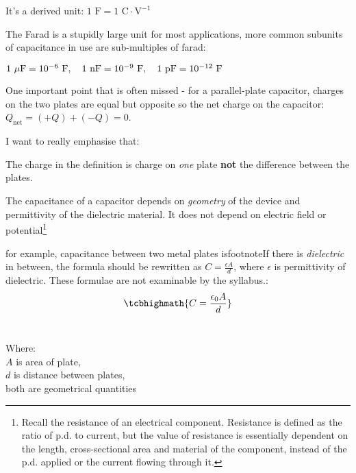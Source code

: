 It's a derived unit: $1 \text{ F} = 1 \text{ C}\cdot\text{V}^{-1}$

The Farad is a stupidly large unit for most applications, more common subunits of capacitance in use are sub-multiples of farad:

{
	
\centering

$1 \text{ $\mu$F} = 10^{-6} \text{ F}, \quad 1 \text{ nF} = 10^{-9} \text{ F}, \quad 1 \text{ pF} = 10^{-12} \text{ F}$

}

One important point that is often missed - for a parallel-plate capacitor, charges on the two plates are equal but opposite so the net charge on the capacitor: $Q_\text{net} = (+Q)+(-Q)=0$. 

I want to really emphasise that:
\begin{ilight}
    The charge in the definition is charge on \emph{one} plate \textbf{not} the difference between the plates.
\end{ilight}

The capacitance of a capacitor depends on \emph{geometry} of the device and permittivity of the dielectric material. It does not depend on electric field or potential\footnote{Recall the resistance of an electrical component. Resistance is defined as the ratio of p.d. to current, but the value of resistance is essentially dependent on the length, cross-sectional area and material of the component, instead of the p.d. applied or the current flowing through it.}

for example, capacitance between two metal plates isfootnote{If there is \emph{dielectric} in between, the formula should be rewritten as $C = \frac{\epsilon A}{d}$, where $\epsilon$ is permittivity of dielectric. These formulae are not examinable by the syllabus.}: $$\tcbhighmath{C=\frac{\epsilon_0 A}{d}}$$\

Where:\\
$A$ is area of plate, \\
$d$ is distance between plates, \\
both are geometrical quantities






